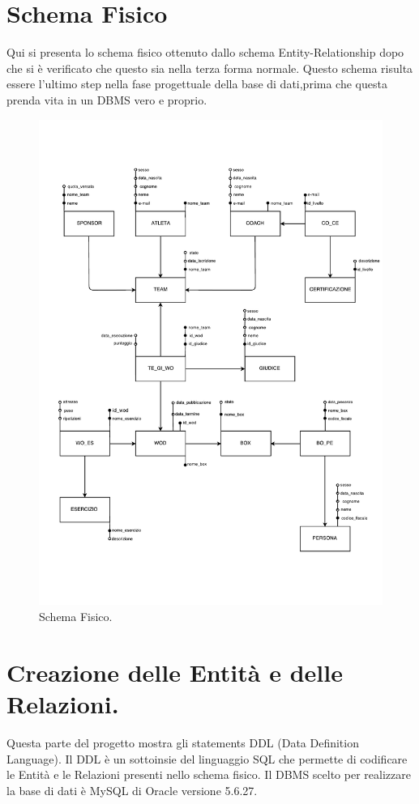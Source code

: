 \documentclass[12pt,a4paper]{article}
\begin{document}
\section{Schema Fisico}
Qui si presenta lo schema fisico ottenuto dallo schema Entity-Relationship dopo che si è verificato che questo sia nella terza forma normale. Questo schema risulta essere l'ultimo step nella fase progettuale della base di dati,prima che questa prenda vita in un DBMS vero e proprio.
\begin{figure}
	\centering
	\caption[Schema Fisico]{Schema Fisico.}
	\includegraphics[width=\textwidth]{schemafisico}
\end{figure}
\newpage
\section{Creazione delle Entità e delle Relazioni.}
Questa parte del progetto mostra gli statements DDL (Data Definition Language). Il DDL è un sottoinsie del linguaggio SQL che permette di codificare le Entità e le Relazioni presenti nello schema fisico. Il DBMS scelto per realizzare la base di dati è MySQL di Oracle versione 5.6.27.

\end{document}

